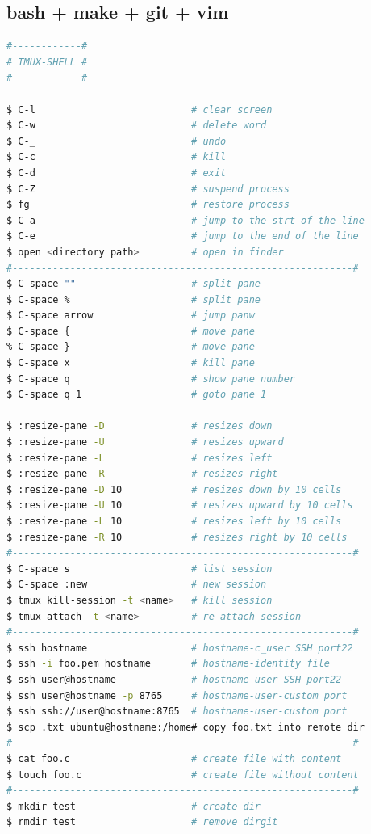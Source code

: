 \documentclass[8pt]{extarticle}
\begin{document}
\begin{small}

\newpage

\begin{multicols}{2}



\section*{bash + make + git + vim}

\begin{lstlisting}[language=bash]
#------------#
# TMUX-SHELL #
#------------#

$ C-l							# clear screen		
$ C-w							# delete word
$ C-_							# undo
$ C-c							# kill		
$ C-d							# exit
$ C-Z							# suspend process
$ fg							# restore process
$ C-a							# jump to the strt of the line
$ C-e							# jump to the end of the line
$ open <directory path>			# open in finder
#-----------------------------------------------------------#
$ C-space ""					# split pane
$ C-space %						# split pane
$ C-space arrow					# jump panw
$ C-space {						# move pane
% C-space }						# move pane
$ C-space x						# kill pane
$ C-space q						# show pane number
$ C-space q 1					# goto pane 1

$ :resize-pane -D 				# resizes down 
$ :resize-pane -U 				# resizes upward 
$ :resize-pane -L 				# resizes left 
$ :resize-pane -R 				# resizes right 
$ :resize-pane -D 10 			# resizes down by 10 cells
$ :resize-pane -U 10 			# resizes upward by 10 cells
$ :resize-pane -L 10 			# resizes left by 10 cells
$ :resize-pane -R 10 			# resizes right by 10 cells
#-----------------------------------------------------------#
$ C-space s						# list session
$ C-space :new					# new session
$ tmux kill-session -t <name>	# kill session
$ tmux attach -t <name>			# re-attach session
#-----------------------------------------------------------#
$ ssh hostname 					# hostname-c_user SSH port22
$ ssh -i foo.pem hostname      	# hostname-identity file
$ ssh user@hostname            	# hostname-user-SSH port22
$ ssh user@hostname -p 8765   	# hostname-user-custom port
$ ssh ssh://user@hostname:8765 	# hostname-user-custom port
$ scp .txt ubuntu@hostname:/home# copy foo.txt into remote dir
#-----------------------------------------------------------#
$ cat foo.c						# create file with content	
$ touch foo.c					# create file without content
#-----------------------------------------------------------#
$ mkdir test					# create dir
$ rmdir test					# remove dirgit 


\end{lstlisting}
\end{multicols}
\end{small}
\end{document}
